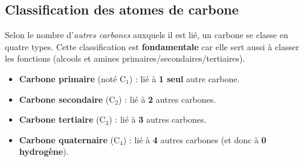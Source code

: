 \documentclass[11pt,a4paper]{article}
\begin{document}
\begin{center}
\hspace{0.4cm}
\end{center}

\subsection{Classification des atomes de carbone}
Selon le nombre d'\emph{autres carbones} auxquels il est lié, un carbone se classe en quatre types. Cette classification est \textbf{fondamentale} car elle sert aussi à classer les fonctions (alcools et amines primaires/secondaires/tertiaires).

\begin{definition}
\hfill
\begin{itemize}[leftmargin=1.6em,itemsep=1pt]
  \item \textbf{Carbone primaire} (noté C$_1$) : lié à \textbf{1 seul} autre carbone.
  \item \textbf{Carbone secondaire} (C$_2$) : lié à \textbf{2} autres carbones.
  \item \textbf{Carbone tertiaire} (C$_3$) : lié à \textbf{3} autres carbones.
  \item \textbf{Carbone quaternaire} (C$_4$) : lié à \textbf{4} autres carbones (et donc à \textbf{0 hydrogène}).
\end{itemize}
\end{definition}
\end{document}
